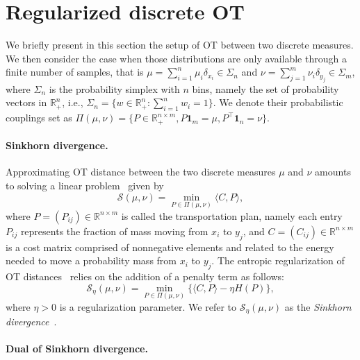 \documentclass{article}
\newcommand{\inr}[1]{\langle #1 \rangle}
\newcommand{\R}{{\mathbb{R}}}
\begin{document}
\section{Regularized discrete OT} 
\label{sec:optimal_transport}

 We briefly present in this section the setup of OT between two discrete measures. We then consider the case when those distributions are only available through a finite number of samples, that is $\mu = \sum_{i=1}^n \mu_i \delta_{x_i} \in \Sigma_n$ and $\nu = \sum_{j=1}^m \nu_i \delta_{y_j} \in \Sigma_m$, where $\Sigma_n$ is the probability simplex with $n$ bins, namely the set of probability vectors in $\R_+^n$, i.e., $\Sigma_n = \{w \in \R_+^n: \sum_{i=1}^n w_i = 1\}.$
We denote their probabilistic couplings set as $\Pi(\mu, \nu) = \{P \in \R_+^{n\times m}, P\mathbf{1}_m = \mu, P^\top \mathbf{1}_n = \nu\}.$ 
\paragraph{Sinkhorn divergence.}

Approximating OT distance between the two discrete measures $\mu$ and $\nu$  amounts to solving a linear problem~\cite{kantorovich1942} given by
\begin{equation}
  \label{monge-kantorovich}
  \mathcal{S}(\mu, \nu) =  \min_{P\in \Pi(\mu, \nu)} \inr{C, P},
\end{equation}
where $P= (P_{ij}) \in \R^{n\times m}$ is called the transportation plan, namely each entry $P_{ij}$ represents the fraction of mass moving from $x_i$ to $y_j$, and $C= (C_{ij}) \in \R^{n\times m}$ is a cost matrix comprised of nonnegative elements and related to the energy needed to move a probability mass from $x_i$ to $y_j$. 
The entropic regularization of OT distances~\citep{cuturinips13} relies on the addition of a penalty term as follows:
\begin{equation}
\label{sinkhorn-primal}
  \mathcal{S}_\eta(\mu, \nu) =  \min_{P\in \Pi(\mu, \nu)} \{\inr{C, P} - \eta H(P)\},
\end{equation}
where $\eta > 0$ is a regularization parameter. We refer to $\mathcal{S}_\eta(\mu, \nu) $ as the \emph{Sinkhorn divergence}~\citep{cuturinips13}.

\paragraph{Dual of Sinkhorn divergence.}
\end{document}
